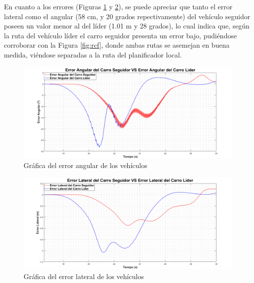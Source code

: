 \par En cuanto a los errores (Figuras \ref{fig:cfea} y \ref{fig:cfel}), se puede apreciar que tanto el error lateral como el angular (58 cm, y 20 grados repectivamente) del vehículo seguidor poseen un valor menor al del líder (1.01 m y 28 grados), lo cual indica que, según la ruta del vehículo líder el carro seguidor presenta un error bajo, pudiéndose corroborar con la Figura \ref{fig:rcf}, donde ambas rutas se asemejan en buena medida, viéndose separadas a la ruta del planificador local.\\

\begin{figure}[H]
	\centering
		\includegraphics[scale=0.35]{Imagenes/cfea}
		\caption{Gráfica del error angular de los vehículos}
		\label{fig:cfea}
\end{figure}	

\begin{figure}[H]
	\centering
		\includegraphics[scale=0.35]{Imagenes/cfel}
		\caption{Gráfica del error lateral de los vehículos}
		\label{fig:cfel}
\end{figure}	



